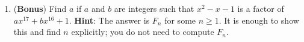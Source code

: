 \documentclass[11pt]{article}
\begin{document}
\begin{enumerate}
\begin{enumerate}
\item (\textbf{Bonus}) Find $a$ if $a$ and $b$ are integers such that $x^2 - x - 1$ is a factor of $ax^{17} + bx^{16} + 1$. \textbf{Hint}: The answer is $F_{n}$ for some $n \geq 1$. It is enough to show this and find $n$ explicitly; you do not need to compute $F_{n}$. 
  \end{enumerate}

    



\end{enumerate}
\end{document}

